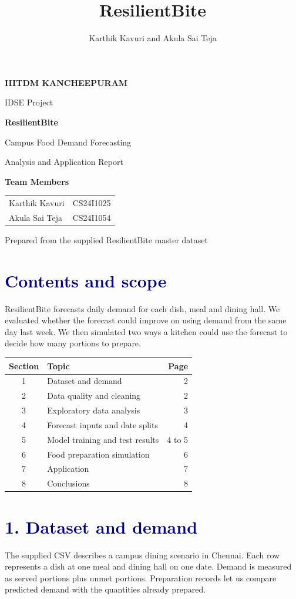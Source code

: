 \documentclass[11pt,a4paper]{article}
\title{ResilientBite}
\author{Karthik Kavuri and Akula Sai Teja}
\date{}
\newcommand{\phase}[1]{\section*{\textcolor{navy}{#1}}}
\begin{document}
\begin{center}
\vspace*{27mm}
{\Large\bfseries IIITDM KANCHEEPURAM\par}
\vspace{3mm}
{\large IDSE Project\par}
\vspace{15mm}
{\Huge\bfseries ResilientBite\par}
\vspace{6mm}
{\Large Campus Food Demand Forecasting\par}
\vspace{11mm}
{\large Analysis and Application Report\par}
\vspace{12mm}
{\large\bfseries Team Members\par}
\vspace{3mm}
\begin{tabular}{@{}l@{\qquad}l@{}}
Karthik Kavuri & CS24I1025 \\
Akula Sai Teja & CS24I1054
\end{tabular}\par
\vspace{22mm}
Prepared from the supplied ResilientBite master dataset
\end{center}
\clearpage
\phase{Contents and scope}
ResilientBite forecasts daily demand for each dish, meal and dining hall. We evaluated whether the forecast could improve on using demand from the same day last week. We then simulated two ways a kitchen could use the forecast to decide how many portions to prepare.

\begin{tabularx}{\linewidth}{@{}cXr@{}}
\toprule
\textbf{Section} & \textbf{Topic} & \textbf{Page} \\
\midrule
1 & Dataset and demand & 2 \\
2 & Data quality and cleaning & 2 \\
3 & Exploratory data analysis & 3 \\
4 & Forecast inputs and date splits & 4 \\
5 & Model training and test results & 4 to 5 \\
6 & Food preparation simulation & 6 \\
7 & Application & 7 \\
8 & Conclusions & 8 \\
\bottomrule
\end{tabularx}
\phase{1. Dataset and demand}
The supplied CSV describes a campus dining scenario in Chennai. Each row represents a dish at one meal and dining hall on one date. Demand is measured as served portions plus unmet portions. Preparation records let us compare predicted demand with the quantities already prepared.
\end{document}
